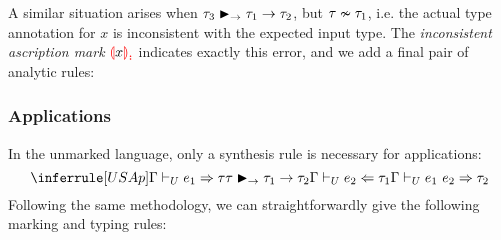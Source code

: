 A similar situation arises when $\matchedArrow{\TMV_3}{\TMV_1}{\TMV_2}$, but
$\inconsistent{\TMV}{\TMV_1}$, i.e. the actual type annotation for $x$ is inconsistent with the
expected input type. The \emph{inconsistent ascription mark} $\ECInconAsc{x}$ indicates exactly this
error, and we add a final pair of analytic rules:
%
\begin{mathpar}

\end{mathpar}

\subsubsection{Applications}
\label{sec:calculus-applications}

In the unmarked language, only a synthesis rule is necessary for applications:
\[%
  \judgment{
    \ctxSynTypeU{\ctx}{\EMV_1}{\TMV} \\
    \matchedArrow{\TMV}{\TMV_1}{\TMV_2} \\
    \ctxAnaTypeU{\ctx}{\EMV_2}{\TMV_1}
  }{
    \ctxSynTypeU{\ctx}{\EAp{\EMV_1}{\EMV_2}}{\TMV_2}
  }{USAp}
\]%
Following the same methodology, we can straightforwardly give the following marking and typing
rules:
%
\begin{mathpar}

\end{mathpar}

